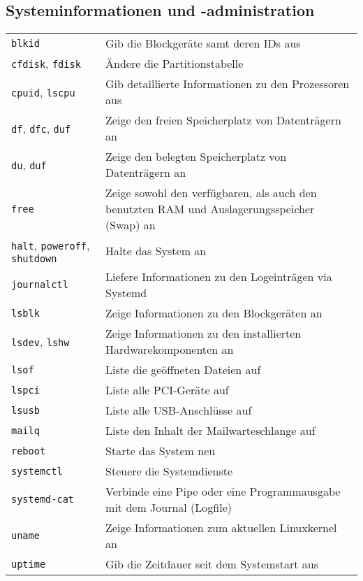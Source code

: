 \documentclass[10pt,a4paper]{article}
\begin{document}
\cheatsheet

\begin{multicols}{2}

\section{Systeminformationen und -administration}
\begin{tabular}{ p{2.5cm} p{8.5cm} }
  \hline
  \texttt{blkid} & Gib die Blockgeräte samt deren IDs aus\\
  \rowcolor{Gray}
  \texttt{cfdisk}, \texttt{fdisk} & Ändere die Partitionstabelle \\
  \texttt{cpuid}, \texttt{lscpu} & Gib detaillierte Informationen zu den Prozessoren aus \\
  \rowcolor{Gray}
  \texttt{df}, \texttt{dfc}, \texttt{duf} & Zeige den freien Speicherplatz von Datenträgern an \\
  \texttt{du}, \texttt{duf} & Zeige den belegten Speicherplatz von Datenträgern an \\
  \rowcolor{Gray}
  \texttt{free} & Zeige sowohl den verfügbaren, als auch den benutzten RAM und Auslagerungsspeicher (Swap) an\\
  \texttt{halt}, \texttt{poweroff}, \texttt{shutdown} & Halte das System an\\
  \rowcolor{Gray}
  \texttt{journalctl} & Liefere Informationen zu den Logeinträgen via Systemd \\
  \texttt{lsblk} & Zeige Informationen zu den Blockgeräten an\\
  \rowcolor{Gray}
  \texttt{lsdev}, \texttt{lshw} & Zeige Informationen zu den installierten Hardwarekomponenten an\\
  \texttt{lsof} & Liste die geöffneten Dateien auf \\
  \rowcolor{Gray}
  \texttt{lspci} & Liste alle PCI-Geräte auf\\
  \texttt{lsusb} & Liste alle USB-Anschlüsse auf\\
  \rowcolor{Gray}
  \texttt{mailq} & Liste den Inhalt der Mailwarteschlange auf \\
  \texttt{reboot} & Starte das System neu\\
  \rowcolor{Gray}
  \texttt{systemctl} & Steuere die Systemdienste \\
  \texttt{systemd-cat} & Verbinde eine Pipe oder eine Programm\-ausgabe mit dem Journal (Logfile) \\
  \rowcolor{Gray}
  \texttt{uname} & Zeige Informationen zum aktuellen Linux\-kernel an \\
  \texttt{uptime} & Gib die Zeitdauer seit dem Systemstart aus \\
  \hline
\end{tabular}


\end{multicols}
\end{document}
